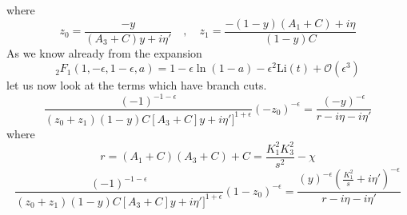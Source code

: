 where
\begin{equation*}
z_0 = \frac{-y}{(A_3 + C)y +i\eta'}\quad,\quad
z_1 = \frac{-(1-y)(A_1 + C)+i\eta}{(1-y)C}
\end{equation*}
As we know already from the expansion
\begin{equation*}
{}_2F_1(1,-\epsilon,1-\epsilon,a) = 1-\epsilon\ln(1-a) - \epsilon^2\mathrm{Li}(t) + \mathcal{O}(\epsilon^{3})
\end{equation*}
let us now look at the terms which have branch cuts. 
\begin{equation*}
\frac{(-1)^{-1-\epsilon}}{(z_0+z_1)(1-y)C[A_3 + C ]y + i\eta']^{1+\epsilon}}(-z_0)^{-\epsilon}
= \frac{(-y)^{-\epsilon}}{r - i\eta-i\eta'}
\end{equation*}
where
\begin{equation*}
r = (A_1 + C)(A_3 + C)+C = \frac{K^2_1K_3^2}{s^2} -\chi 
\end{equation*}
\begin{equation*}
\frac{(-1)^{-1-\epsilon}}{(z_0+z_1)(1-y)C[A_3 + C ]y + i\eta']^{1+\epsilon}}(1-z_0)^{-\epsilon}
= \frac{(y)^{-\epsilon}(\frac{K_1^2}{s}+i\eta')^{-\epsilon}}{r - i\eta-i\eta'}
\end{equation*}









